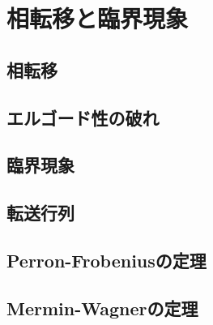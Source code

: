 \documentclass[\main/main.tex]{subfiles}
\begin{document}
\section{
    相転移と臨界現象
}
\subsection{
    相転移
}
\subsection{
    エルゴード性の破れ
}
\subsection{
    臨界現象
}
\subsection{
    転送行列
}
\subsection{
    Perron-Frobeniusの定理
}
\subsection{
    Mermin-Wagnerの定理
}
\end{document}
